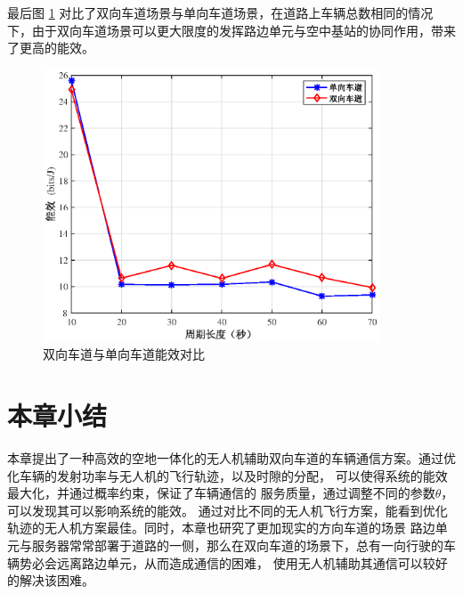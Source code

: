 最后图 \ref{comparetwoway} 对比了双向车道场景与单向车道场景，在道路上车辆总数相同的情况下，由于双向车道场景可以更大限度的发挥路边单元与空中基站的协同作用，带来了更高的能效。

\begin{figure}[H]
\centering
\includegraphics[width=10cm]{figures//chap4//双向车道.eps}
\caption{双向车道与单向车道能效对比}
\label{comparetwoway}
\end{figure}
\section{本章小结}\label{section4-6}
本章提出了一种高效的空地一体化的无人机辅助双向车道的车辆通信方案。通过优化车辆的发射功率与无人机的飞行轨迹，以及时隙的分配，
可以使得系统的能效最大化，并通过概率约束，保证了车辆通信的 服务质量，通过调整不同的参数$\theta$，可以发现其可以影响系统的能效。
通过对比不同的无人机飞行方案，能看到优化轨迹的无人机方案最佳。同时，本章也研究了更加现实的方向车道的场景
路边单元与服务器常常部署于道路的一侧，那么在双向车道的场景下，总有一向行驶的车辆势必会远离路边单元，从而造成通信的困难，
使用无人机辅助其通信可以较好的解决该困难。

